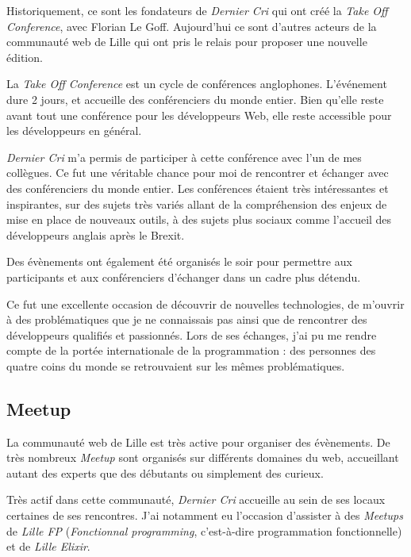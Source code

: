 \bigskip

Historiquement, ce sont les fondateurs de \emph{Dernier Cri} qui ont
créé la \emph{Take Off Conference}, avec Florian Le Goff. Aujourd'hui ce
sont d'autres acteurs de la communauté web de Lille qui ont pris le
relais pour proposer une nouvelle édition.

\bigskip

La \emph{Take Off Conference} est un cycle de conférences anglophones.
L'événement dure 2 jours, et accueille des conférenciers du monde
entier. Bien qu'elle reste avant tout une conférence pour les
développeurs Web, elle reste accessible pour les développeurs en
général.

\bigskip

\emph{Dernier Cri} m'a permis de participer à cette conférence avec l'un
de mes collègues. Ce fut une véritable chance pour moi de rencontrer et
échanger avec des conférenciers du monde entier. Les conférences étaient
très intéressantes et inspirantes, sur des sujets très variés allant de
la compréhension des enjeux de mise en place de nouveaux outils, à des
sujets plus sociaux comme l'accueil des développeurs anglais après le
Brexit.

\bigskip

Des évènements ont également été organisés le soir pour permettre aux
participants et aux conférenciers d'échanger dans un cadre plus détendu.

\bigskip

Ce fut une excellente occasion de découvrir de nouvelles technologies,
de m'ouvrir à des problématiques que je ne connaissais pas ainsi que de
rencontrer des développeurs qualifiés et passionnés. Lors de ses
échanges, j'ai pu me rendre compte de la portée internationale de la
programmation : des personnes des quatre coins du monde se retrouvaient
sur les mêmes problématiques.

\bigskip

\subsection{Meetup}\label{meetup}

\bigskip

La communauté web de Lille est très active pour organiser des
évènements. De très nombreux \emph{Meetup} sont organisés sur différents
domaines du web, accueillant autant des experts que des débutants ou
simplement des curieux.

\bigskip

Très actif dans cette communauté, \emph{Dernier Cri} accueille au sein
de ses locaux certaines de ses rencontres. J'ai notamment eu l'occasion
d'assister à des \emph{Meetups} de \emph{Lille FP} (\emph{Fonctionnal
programming}, c'est-à-dire programmation fonctionnelle) et de
\emph{Lille Elixir}.

